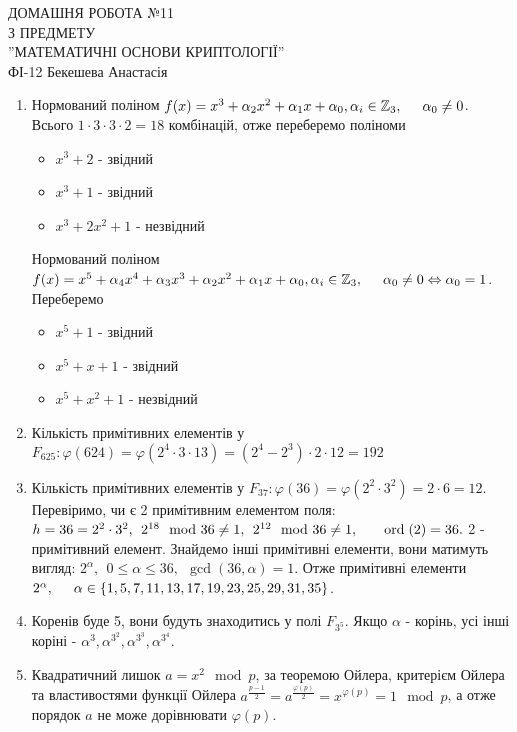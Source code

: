 \documentclass[a4paper,12pt]{article}
\newcommand{\ord}[0]{\textrm{\hspace*{0.15cm}ord\hspace*{0.1cm}}}
\newcommand\tab[1][0.5cm]{\hspace*{#1}}
\begin{document}
	\begin{justify}
		\thispagestyle{empty}\setlength{\parindent}{0pt}
 		\vspace*{\fill}
  		\begin{center}
  			\noindent\makebox[\linewidth]{\rule{\paperwidth}{0.4pt}}
   			\LARGE{\bigbreak ДОМАШНЯ РОБОТА №11\\З ПРЕДМЕТУ\\''МАТЕМАТИЧНІ ОСНОВИ КРИПТОЛОГІЇ''\\\bigbreak} 
   			ФІ-12 Бекешева Анастасія 
   			\noindent\makebox[\linewidth]{\rule{\paperwidth}{0.4pt}}
  		\end{center}
 		\vspace*{\fill}\newpage
 		\begin{enumerate}
 			\item Нормований поліном $f(x)=x^3+\alpha_2x^2+\alpha_1x+\alpha_0,\alpha_i\in\mathbb{Z}_3,\tab \alpha_0\neq 0$. Всього $1\cdot3\cdot3\cdot2=18$ комбінацій, отже переберемо поліноми
 				\begin{itemize}
 					\item $x^3+2$ - звідний
 					\item $x^3+1$ - звідний
 					\item $x^3+2x^2+1$ - незвідний
 				\end{itemize}
 				Нормований поліном $f(x)=x^5+\alpha_4x^4+\alpha_3x^3+\alpha_2x^2+\alpha_1x+\alpha_0,\alpha_i\in\mathbb{Z}_3,\tab \alpha_0\neq 0\Leftrightarrow \alpha_0=1$. Переберемо
 				\begin{itemize}
 					\item $x^5+1$ - звідний
 					\item $x^5+x+1$ - звідний
 					\item $x^5+x^2+1$ - незвідний
 				\end{itemize}
 			\item Кількість примітивних елементів у $F_{625}:\varphi(624)=\varphi(2^4\cdot3\cdot13)=(2^4-2^3)\cdot2\cdot12=192$
 			\item  Кількість примітивних елементів у $F_{37}:\varphi(36)=\varphi(2^2\cdot3^2)=2\cdot6=12$. Перевіримо, чи є 2 примітивним елементом поля: $h=36=2^2\cdot3^2,\>\>2^{18}\mod36\neq1,\>\>2^{12}\mod36\neq1,\tab \ord(2)=36.$ 2 - примітивний елемент. Знайдемо інші примітивні елементи, вони матимуть вигляд: $2^\alpha,\>\>0\leq\alpha\leq36,\>\>\gcd(36,\alpha)=1$. Отже примітивні елементи $2^\alpha,\tab\alpha\in\{1,5,7,11,13,17,19,23,25,29,31,35\}$.
 			\item Коренів буде 5, вони будуть знаходитись у полі $F_{3^5}$. Якщо $\alpha$ - корінь, усі інші коріні - $\alpha^3,\alpha^{3^2},\alpha^{3^3},\alpha^{3^4}$.
 			\item Квадратичний лишок $a=x^2\mod p$, за теоремою Ойлера, критерієм Ойлера та властивостями функції Ойлера $a^{\frac{p-1}2}=a^{\frac{\varphi(p)}2}=x^{\varphi(p)}=1\mod p$, а отже порядок $a$ не може дорівнювати $\varphi(p)$. 
  		\end{enumerate}
 	\end{justify}
\end{document}
